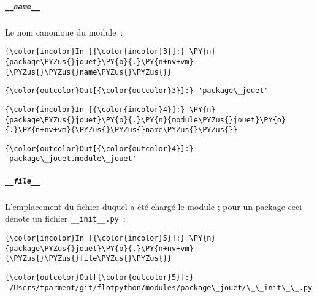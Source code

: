     \hypertarget{name__}{%
\subparagraph{\texorpdfstring{\texttt{\_\_name\_\_}}{\_\_name\_\_}}\label{name__}}

    Le nom canonique du module~:

    \begin{Verbatim}[commandchars=\\\{\},frame=single,framerule=0.3mm,rulecolor=\color{cellframecolor}]
{\color{incolor}In [{\color{incolor}3}]:} \PY{n}{package\PYZus{}jouet}\PY{o}{.}\PY{n+nv+vm}{\PYZus{}\PYZus{}name\PYZus{}\PYZus{}}
\end{Verbatim}


\begin{Verbatim}[commandchars=\\\{\},frame=single,framerule=0.3mm,rulecolor=\color{cellframecolor}]
{\color{outcolor}Out[{\color{outcolor}3}]:} 'package\_jouet'
\end{Verbatim}
            
    \begin{Verbatim}[commandchars=\\\{\},frame=single,framerule=0.3mm,rulecolor=\color{cellframecolor}]
{\color{incolor}In [{\color{incolor}4}]:} \PY{n}{package\PYZus{}jouet}\PY{o}{.}\PY{n}{module\PYZus{}jouet}\PY{o}{.}\PY{n+nv+vm}{\PYZus{}\PYZus{}name\PYZus{}\PYZus{}}
\end{Verbatim}


\begin{Verbatim}[commandchars=\\\{\},frame=single,framerule=0.3mm,rulecolor=\color{cellframecolor}]
{\color{outcolor}Out[{\color{outcolor}4}]:} 'package\_jouet.module\_jouet'
\end{Verbatim}
            
    \hypertarget{file__}{%
\subparagraph{\texorpdfstring{\texttt{\_\_file\_\_}}{\_\_file\_\_}}\label{file__}}

    L'emplacement du fichier duquel a été chargé le module ; pour un package
ceci dénote un fichier \texttt{\_\_init\_\_.py}~:

    \begin{Verbatim}[commandchars=\\\{\},frame=single,framerule=0.3mm,rulecolor=\color{cellframecolor}]
{\color{incolor}In [{\color{incolor}5}]:} \PY{n}{package\PYZus{}jouet}\PY{o}{.}\PY{n+nv+vm}{\PYZus{}\PYZus{}file\PYZus{}\PYZus{}}
\end{Verbatim}


\begin{Verbatim}[commandchars=\\\{\},frame=single,framerule=0.3mm,rulecolor=\color{cellframecolor}]
{\color{outcolor}Out[{\color{outcolor}5}]:} '/Users/tparment/git/flotpython/modules/package\_jouet/\_\_init\_\_.py'
\end{Verbatim}
            
